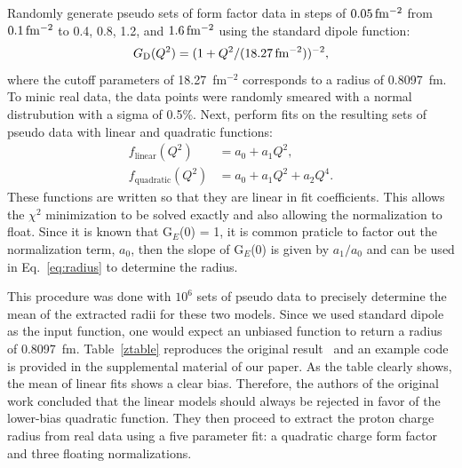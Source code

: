\documentclass[10pt,aps,prc,twocolumn]{revtex4-1}
\begin{document}
Randomly generate pseudo sets of form factor data in steps 
of $\unit[0.05]{fm^{-2}}$ from $\unit[0.1]{fm^{-2}}$ to 0.4, 0.8, 1.2,
and $\unit[1.6]{fm^{-2}}$ using the standard dipole function:
\begin{equation}
\label{sd}
G\mathrm{_D}(Q^2) = ( 1 + Q^2/(\unit[18.27]{fm^{-2}}))^{-2},
\end{equation}
where the cutoff parameters of 18.27~fm$^{-2}$ corresponds to a radius of 0.8097~fm.
To minic real data, the data points were randomly smeared with a normal distrubution
with a sigma of 0.5\%.  
Next, perform fits on the resulting sets of pseudo data with linear and quadratic functions:
\begin{align}
f_{\mathrm{linear}}(Q^2) &  = a_0 + a_1 Q^2, \label{Eq:linear} \\
f_{\mathrm{quadratic}}(Q^2) & = a_0 + a_1 Q^2 + a_2 Q^4. \label{Eq:quadratic}
\end{align}
These functions are written so that they are linear in fit coefficients.  
This allows the $\chi^2$ minimization to be solved exactly
and also allowing the normalization to float.   Since it is known that
G$_E$(0) = 1, it is common praticle to factor out the normalization term, $a_0$, 
then the slope of G$_E$(0) is given by $a_1/a_0$ and can be used in Eq.~\ref{eq:radius} 
to determine the radius.

This procedure was done with $10^6$ sets of pseudo data to 
precisely determine the mean of the extracted 
radii for these two models.   Since we used standard dipole as the input function, one would expect an unbiased 
function to return a radius of 0.8097~fm.
Table~\ref{ztable} reproduces the original result~\cite{Borkowski:1975} and
an example code is provided in the supplemental material of our paper.  
As the table clearly shows, the mean of linear fits shows a clear bias. 
Therefore, the authors of the original work concluded that the linear models 
should always be rejected in favor of the lower-bias quadratic function.
They then proceed to extract the proton charge radius from real data using a five parameter 
fit: a quadratic charge form factor and three floating normalizations.
\end{document}

